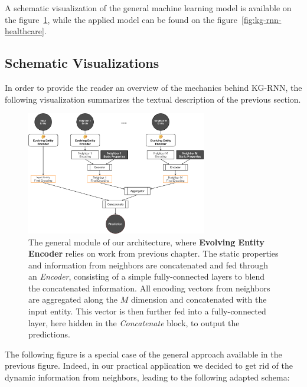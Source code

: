 A schematic visualization of the general machine learning model is available on the figure~\ref{fig:kg-rnn-general}, while the applied model can be found on the figure~\ref{fig:kg-rnn-healthcare}.

\newpage
\subsection{Schematic Visualizations}
In order to provide the reader an overview of the mechanics behind KG-RNN, the following visualization summarizes the textual description of the previous section.

\begin{figure}[H]
 \centering
 \includegraphics[width=0.7\textwidth]{figures/kg-rnn-general.pdf}
 \caption{The general module of our architecture, where \textbf{Evolving Entity Encoder} relies on work from previous chapter. The static properties and information from neighbors are concatenated and fed through an \emph{Encoder}, consisting of a simple fully-connected layers to blend the concatenated information. All encoding vectors from neighbors are aggregated along the $M$ dimension and concatenated with the input entity. This vector is then further fed into a fully-connected layer, here hidden in the \emph{Concatenate} block, to output the predictions.}
 \label{fig:kg-rnn-general}
\end{figure}

The following figure is a special case of the general approach available in the previous figure. Indeed, in our practical application we decided to get rid of the dynamic information from neighbors, leading to the following adapted schema:

